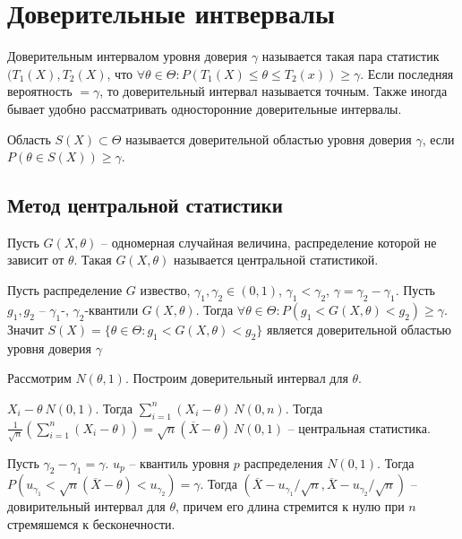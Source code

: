 \documentclass[document.tex]{subfiles}
\begin{document}
\section{Доверительные интвервалы}
\begin{definition}
    Доверительным интервалом уровня доверия $\gamma$ называется такая пара статистик $(T_1(X), T_2(X)$, что $\forall
    \theta \in \Theta: P(T_1(X) \leq \theta \leq T_2(x)) \geq \gamma$. Если последняя вероятность $= \gamma$, то
    доверительный интервал называется точным. Также иногда бывает удобно рассматривать односторонние доверительные
    интервалы.
\end{definition}

\begin{definition}
    Область $S(X) \subset \Theta$ называется доверительной областью уровня доверия $\gamma$, если $P(\theta \in S(X))
    \geq \gamma$.
\end{definition}

\subsection{Метод центральной статистики}
Пусть $G(X, \theta)$ -- одномерная случайная величина, распределение которой не зависит от $\theta$. Такая $G(X,
\theta)$ называется центральной статистикой. 

Пусть распределение $G$ извество, $\gamma_1, \gamma_2 \in (0, 1)$, $\gamma_1 < \gamma_2$, $\gamma = \gamma_2 -
\gamma_1$. Пусть $g_1, g_2$ -- $\gamma_1$-, $\gamma_2$-квантили $G(X, \theta)$. Тогда $\forall \theta \in \Theta:
P(g_1 < G(X, \theta) < g_2) \geq \gamma$. Значит $S(X) = \{\theta \in \Theta: g_1 < G(X, \theta) < g_2\}$ является
доверительной областью уровня доверия $\gamma$

\begin{example}
    Рассмотрим $N(\theta, 1)$. Построим доверительный интервал для $\theta$.

    $X_i - \theta ~ N(0, 1)$. Тогда $\sum_{i = 1}^n (X_i - \theta) ~ N(0, n)$. Тогда $\frac{1}{\sqrt{n}}(\sum_{i = 1}^n
    (X_i - \theta)) = \sqrt{n}(\overline X - \theta) ~ N(0, 1)$ -- центральная статистика.

    Пусть $\gamma_2 - \gamma_1 = \gamma$. $u_p$ -- квантиль уровня $p$ распределения $N(0, 1)$. Тогда $P(u_{\gamma_1} <
    \sqrt{n}(\overline X - \theta) < u_{\gamma_2}) = \gamma$. Тогда $(\overline X - u_{\gamma_1} / \sqrt{n}, \overline X
    - u_{\gamma_2} / \sqrt{n})$ -- довирительный интервал для $\theta$, причем его длина стремится к нулю при $n$
    стремяшемся к бесконечности.
\end{example}
\end{document}
